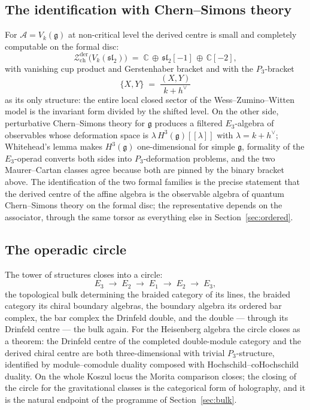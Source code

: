 \documentclass[11pt]{amsart}
\numberwithin{equation}{section}
\theoremstyle{plain}
\theoremstyle{definition}
\theoremstyle{remark}
\newcommand{\cA}{\mathcal{A}}
\newcommand{\cZ}{\mathcal{Z}}
\newcommand{\bC}{\mathbb{C}}
\newcommand{\fg}{\mathfrak{g}}
\newcommand{\dvee}{h^{\vee}}
\begin{document}
\subsection{The identification with Chern--Simons theory}

For $\cA=V_k(\fg)$ at non-critical level the derived centre is small
and completely computable on the formal disc:
\begin{equation}
\cZ^{\mathrm{der}}_{\mathrm{ch}}\bigl(V_k(\mathfrak{sl}_2)\bigr)
\;=\;\bC\,\oplus\,\mathfrak{sl}_2[-1]\,\oplus\,\bC[-2],
\end{equation}
with vanishing cup product and Gerstenhaber bracket and with the
$P_3$-bracket
\begin{equation}
\{X,Y\}\;=\;\frac{(X,Y)}{k+\dvee}
\end{equation}
as its only structure: the entire local closed sector of the
Wess--Zumino--Witten model is the invariant form divided by the
shifted level. On the other side, perturbative Chern--Simons theory
for $\fg$ produces a filtered $E_3$-algebra of observables whose
deformation space is $\lambda\,H^{3}(\fg)[[\lambda]]$ with
$\lambda=k+\dvee$; Whitehead's lemma makes $H^{3}(\fg)$ one-dimensional
for simple $\fg$, formality of the $E_3$-operad converts both sides
into $P_3$-deformation problems, and the two Maurer--Cartan classes
agree because both are pinned by the binary bracket above. The
identification of the two formal families is the precise statement
that the derived centre of the affine algebra is the observable
algebra of quantum Chern--Simons theory on the formal disc; the
representative depends on the associator, through the same torsor as
everything else in Section~\ref{sec:ordered}.

\subsection{The operadic circle}

The tower of structures closes into a circle:
\begin{equation}
E_3\;\longrightarrow\;E_2\;\longrightarrow\;E_1
\;\longrightarrow\;E_2\;\longrightarrow\;E_3,
\end{equation}
the topological bulk determining the braided category of its lines,
the braided category its chiral boundary algebras, the boundary
algebra its ordered bar complex, the bar complex the Drinfeld double,
and the double --- through its Drinfeld centre --- the bulk again.
For the Heisenberg algebra the circle closes as a theorem: the
Drinfeld centre of the completed double-module category and the
derived chiral centre are both three-dimensional with trivial
$P_3$-structure, identified by module--comodule duality composed with
Hochschild--coHochschild duality. On the whole Koszul locus the
Morita comparison closes; the closing of the circle for the
gravitational classes is the categorical form of holography, and it
is the natural endpoint of the programme of Section~\ref{sec:bulk}.
\end{document}
